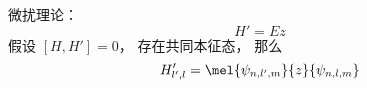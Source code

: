 

微扰理论：
\begin{equation}
H' = E z
\end{equation}
假设 $[H, H'] = 0$， 存在共同本征态， 那么
\begin{equation}
H'_{l',l} = \mel{\psi_{n,l',m}}{z}{\psi_{n,l,m}}
\end{equation}

